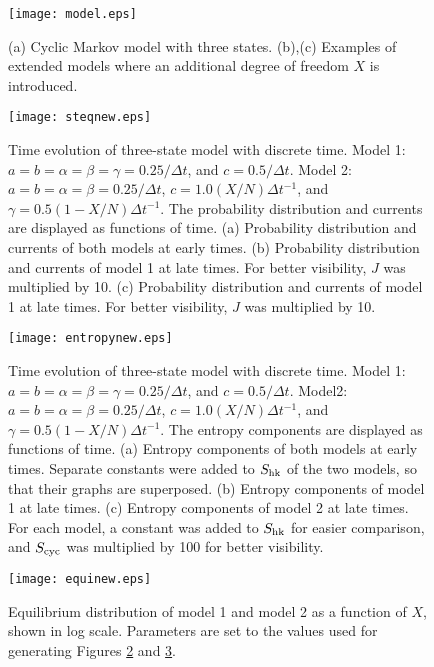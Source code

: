 \documentclass[aps,pre,amsmath,amssymb,floatfix,preprint,nofootinbib]{revtex4}
\begin{document}
\newpage
\begin{figure}
\texttt{[image: model.eps]}
\caption{(a) Cyclic Markov model with three states. (b),(c) Examples of extended models where an additional degree of freedom $X$ is introduced. }
\label{model} %
\end{figure}
\begin{figure}
\texttt{[image: steqnew.eps]}
\caption{Time evolution of three-state model with discrete time. Model 1: $a=b=\alpha=\beta=\gamma=0.25/\Delta t$, and $c =0.5/\Delta t$. Model 2: $a=b=\alpha=\beta=0.25/\Delta t$, $c =1.0 (X/N)\Delta t^{-1}$, and $\gamma=0.5(1-X/N)\Delta t^{-1}$. The probability distribution and currents are displayed as functions of time. (a)  Probability distribution and currents of both models at early times. (b)  Probability distribution and currents of model 1 at late times. For better visibility, $J$ was multiplied by 10. (c) Probability distribution and currents of model 1 at late times. For better visibility, $J$ was multiplied by 10. }
\label{steady} %
\end{figure}
\begin{figure}
\texttt{[image: entropynew.eps]}
\caption{Time evolution of three-state model with discrete time. Model 1: $a=b=\alpha=\beta=\gamma=0.25/\Delta t$, and $c =0.5/\Delta t$. Model2: $a=b=\alpha=\beta=0.25/\Delta t$, $c =1.0 (X/N)\Delta t^{-1}$, and $\gamma=0.5(1-X/N)\Delta t^{-1}$. The entropy components are displayed as functions of time. (a) Entropy components of both models at early times. Separate constants were added to $S_{\rm hk}$ of the two models, so that their graphs are superposed. (b) Entropy components of model 1 at late times. (c) Entropy components of model 2 at late times. For each model, a constant was added to $S_{\rm hk}$ for easier comparison, and $S_{\rm cyc}$  was multiplied by 100 for better visibility.}
\label{entropy} %
\end{figure}
\begin{figure}
\texttt{[image: equinew.eps]}
\caption{Equilibrium distribution of model 1 and model 2 as a function of $X$, shown in log scale. Parameters are set to the values used for generating Figures \ref{steady} and \ref{entropy}.}
\label{equi} %
\end{figure}
\end{document}
